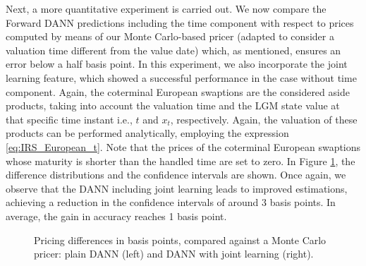 		Next, a more quantitative experiment is carried out. We now compare the Forward DANN predictions including the time component with respect to prices computed by means of our Monte Carlo-based pricer (adapted to consider a valuation time different from the value date) which, as mentioned, ensures an error below a half basis point. In this experiment, we also incorporate the joint learning feature, which showed a successful performance in the case without time component. Again, the coterminal European swaptions are the considered aside products, taking into account the valuation time and the LGM state value at that specific time instant i.e., $t$ and $x_t$, respectively. Again, the valuation of these products can be performed analytically, employing the expression \eqref{eq:IRS_European_t}. Note that the prices of the coterminal European swaptions whose maturity is shorter than the handled time are set to zero. In Figure \ref{fig:diferences_time}, the difference distributions and the confidence intervals are shown. Once again, we observe that the DANN including joint learning leads to improved estimations, achieving a reduction in the confidence intervals of around $3$ basis points. In average, the gain in accuracy reaches 1 basis point.
		 \begin{figure}[h!]
			\centering
			\caption{Pricing differences in basis points, compared against a Monte Carlo pricer: plain DANN (left) and DANN with joint learning (right).}
			\label{fig:diferences_time}
		\end{figure}

